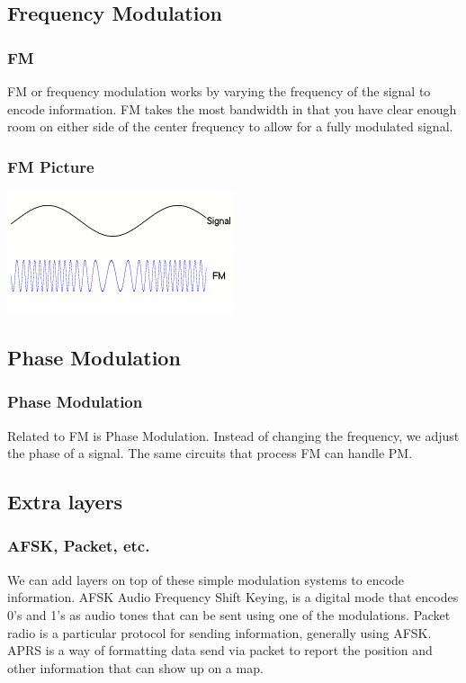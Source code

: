 \documentclass[10pt]{beamer}
\begin{document}
\subsection{Frequency Modulation}

\begin{frame}
\frametitle{FM}
FM or frequency modulation works by varying the frequency of the signal to encode information. FM takes the most bandwidth in that you have clear enough room on either side of the center frequency to allow for a fully modulated signal.
\end{frame}

\begin{frame}
\frametitle{FM Picture}
\includegraphics[height=.5\textheight]{fm.png}
\end{frame}

\subsection{Phase Modulation}

\begin{frame}
\frametitle{Phase Modulation}
Related to FM is Phase Modulation. Instead of changing the frequency, we adjust the phase of a signal. The same circuits that process FM can handle PM.
\end{frame}

\subsection{Extra layers}
\begin{frame}
\frametitle{AFSK, Packet, etc.}
We can add layers on top of these simple modulation systems to encode information. AFSK Audio Frequency Shift Keying, is a digital mode that encodes 0's and 1's as audio tones that can be sent using one of the modulations. Packet radio is a particular protocol for sending information, generally using AFSK. APRS is a way of formatting data send via packet to report the position and other information that can show up on a map.
\end{frame}
\end{document}
